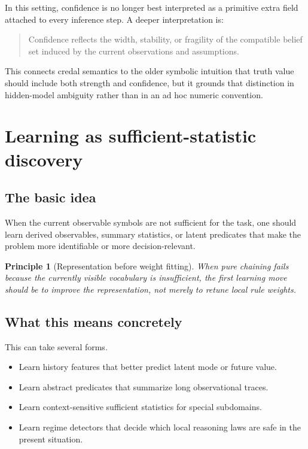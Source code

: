 \documentclass[11pt]{article}
\newtheorem{principle}{Principle}
\begin{document}
In this setting, confidence is no longer best interpreted as a primitive extra
field attached to every inference step.  A deeper interpretation is:
\begin{quote}
Confidence reflects the width, stability, or fragility of the compatible belief
set induced by the current observations and assumptions.
\end{quote}

This connects credal semantics to the older symbolic intuition that truth value
should include both strength and confidence, but it grounds that distinction in
hidden-model ambiguity rather than in an ad hoc numeric convention.

\section{Learning as sufficient-statistic discovery}

\subsection{The basic idea}

When the current observable symbols are not sufficient for the task, one should
learn derived observables, summary statistics, or latent predicates that make
the problem more identifiable or more decision-relevant.

\begin{principle}[Representation before weight fitting]
When pure chaining fails because the currently visible vocabulary is
insufficient, the first learning move should be to improve the representation,
not merely to retune local rule weights.
\end{principle}

\subsection{What this means concretely}

This can take several forms.
\begin{itemize}
  \item Learn history features that better predict latent mode or future value.
  \item Learn abstract predicates that summarize long observational traces.
  \item Learn context-sensitive sufficient statistics for special subdomains.
  \item Learn regime detectors that decide which local reasoning laws are safe
        in the present situation.
\end{itemize}
\end{document}
